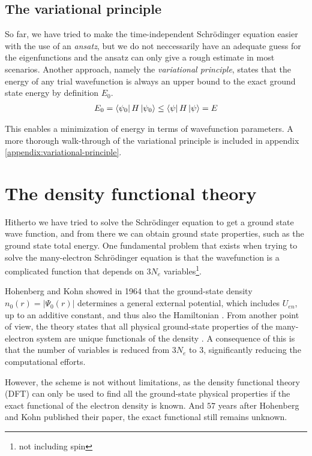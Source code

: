 \subsection{The variational principle}
So far, we have tried to make the time-independent Schrödinger equation easier with the use of an \textit{ansatz}, but we do not neccessarily have an adequate guess for the eigenfunctions and the ansatz can only give a rough estimate in most scenarios. Another approach, namely the \textit{variational principle}, states that the energy of any trial wavefunction is always an upper bound to the exact ground state energy by definition $E_0$.
\begin{align}
  E_0 = \bra{\psi_0 } H \ket{\psi_0} \leq \bra{\psi}H\ket{\psi} = E
\end{align}

This enables a minimization of energy in terms of wavefunction parameters. A more thorough walk-through of the variational principle is included in appendix \ref{appendix:variational-principle}.

\section{The density functional theory}

Hitherto we have tried to solve the Schrödinger equation to get a ground state wave function, and from there we can obtain ground state properties, such as the ground state total energy. One fundamental problem that exists when trying to solve the many-electron Schrödinger equation is that the wavefunction is a complicated function that depends on $3N_e$ variables\footnote{not including spin}.

Hohenberg and Kohn \cite{Hohenberg1964} showed in 1964 that the ground-state density $n_0(r) = \lvert \Psi_0 (r)\rvert$ determines a general external potential, which includes $U_{en}$, up to an additive constant, and thus also the Hamiltonian \cite{Toulouse2019}. From another point of view, the theory states that all physical ground-state properties of the many-electron system are unique functionals of the density \cite{Persson2020}. A consequence of this is that the number of variables is reduced from $3N_e$ to $3$, significantly reducing the computational efforts.

However, the scheme is not without limitations, as the density functional theory (DFT) can only be used to find all the ground-state physical properties if the exact functional of the electron density is known. And $57$ years after Hohenberg and Kohn published their paper, the exact functional still remains unknown.

